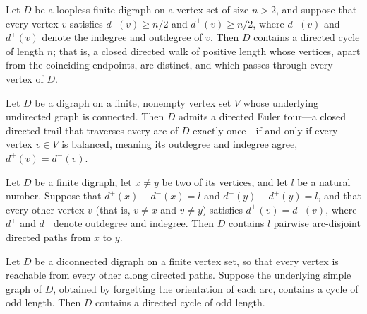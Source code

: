 \begin{theorem}
\label{ghouila_houri_directed_hamilton_cycle}
\leanok
{}
Let $D$ be a loopless finite digraph on a vertex set of size $n > 2$, and suppose that
every vertex $v$ satisfies $d^{-}(v) \ge n/2$ and $d^{+}(v) \ge n/2$, where $d^{-}(v)$
and $d^{+}(v)$ denote the indegree and outdegree of $v$. Then $D$ contains a directed
cycle of length $n$; that is, a closed directed walk of positive length whose vertices,
apart from the coinciding endpoints, are distinct, and which passes through every vertex
of $D$.
\end{theorem}

\begin{theorem}
\label{exists_directedEulerTour_iff}
\leanok
{}
Let $D$ be a digraph on a finite, nonempty vertex set $V$ whose underlying undirected
graph is connected. Then $D$ admits a directed Euler tour—a closed directed trail that
traverses every arc of $D$ exactly once—if and only if every vertex $v \in V$ is
balanced, meaning its outdegree and indegree agree, $d^{+}(v) = d^{-}(v)$.
\end{theorem}

\begin{theorem}
\label{exists_arcDisjoint_directedPaths}
Let $D$ be a finite digraph, let $x \neq y$ be two of its vertices, and let $l$ be a
natural number. Suppose that $d^{+}(x) - d^{-}(x) = l$ and $d^{-}(y) - d^{+}(y) = l$,
and that every other vertex $v$ (that is, $v \neq x$ and $v \neq y$) satisfies $d^{+}(v)
= d^{-}(v)$, where $d^{+}$ and $d^{-}$ denote outdegree and indegree. Then $D$ contains
$l$ pairwise arc-disjoint directed paths from $x$ to $y$.
\end{theorem}

\begin{theorem}
\label{exists_directed_odd_cycle}
\leanok
{}
Let $D$ be a diconnected digraph on a finite vertex set, so that every vertex is
reachable from every other along directed paths. Suppose the underlying simple graph of
$D$, obtained by forgetting the orientation of each arc, contains a cycle of odd length.
Then $D$ contains a directed cycle of odd length.
\end{theorem}

